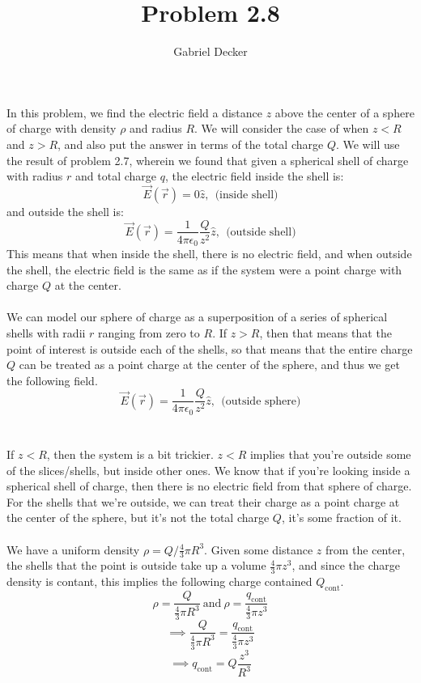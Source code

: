\documentclass[12pt]{article}
\title{Problem 2.8}
\author{Gabriel Decker}
\begin{document}
\maketitle
\begin{flushleft}


In this problem, we find the electric field a distance $z$ above the center of a sphere of charge with density $\rho$ and radius $R$.
We will consider the case of when $z<R$ and $z>R$, and also put the answer in terms of the total charge $Q$.
We will use the result of problem 2.7, wherein we found that given a spherical shell of charge with radius $r$ and total charge $q$, the electric field inside the shell is:
$$\vec{E}(\vec{r})=0\hat{z},\ \ \text{(inside shell)}$$
and outside the shell is:
$$\vec{E}(\vec{r})=\frac{1}{4\pi\epsilon_0}\frac{Q}{z^2}\hat{z},\ \ \text{(outside shell)}$$
This means that when inside the shell, there is no electric field, and when outside the shell, the electric field is the same as if the system were a point charge with charge $Q$ at the center.\\~\\

We can model our sphere of charge as a superposition of a series of spherical shells with radii $r$ ranging from zero to $R$.
If $z>R$, then that means that the point of interest is outside each of the shells, so that means that the entire charge $Q$ can be treated as a point charge at the center of the sphere, and thus we get the following field.
$$\vec{E}(\vec{r})=\frac{1}{4\pi\epsilon_0}\frac{Q}{z^2}\hat{z},\ \ \text{(outside sphere)}$$\\~\\

If $z<R$, then the system is a bit trickier.
$z<R$ implies that you're outside some of the slices/shells, but inside other ones.
We know that if you're looking inside a spherical shell of charge, then there is no electric field from that sphere of charge.
For the shells that we're outside, we can treat their charge as a point charge at the center of the sphere, but it's not the total charge $Q$, it's some fraction of it.\\~\\

We have a uniform density $\rho=Q/\frac{4}{3}\pi R^3$.
Given some distance $z$ from the center, the shells that the point is outside take up a volume $\frac{4}{3}\pi z^3$, and since the charge density is contant, this implies the following charge contained $Q_\text{cont}$.
$$\rho=\frac{Q}{\frac{4}{3}\pi R^3}\ \text{and}\  \rho=\frac{q_\text{cont}}{\frac{4}{3}\pi z^3}$$
$$\implies\frac{Q}{\frac{4}{3}\pi R^3}=\frac{q_\text{cont}}{\frac{4}{3}\pi z^3}$$
$$\implies q_\text{cont}=Q\frac{z^3}{R^3}$$\\~\\


\end{flushleft}
\end{document}
